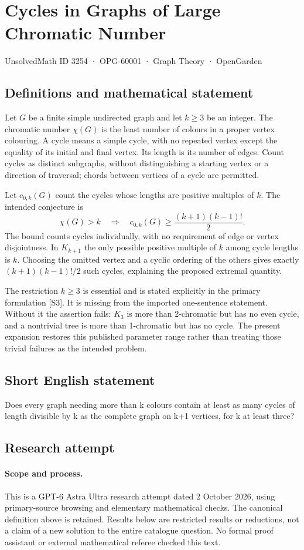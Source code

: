 \documentclass[11pt,a4paper]{article}
\begin{document}
\section*{Cycles in Graphs of Large Chromatic Number}\label{3254}
{\small UnsolvedMath ID 3254 · OPG-60001 · Graph Theory · OpenGarden}
\subsection{Definitions and mathematical statement}
Let $G$ be a finite simple undirected graph and let $k\ge3$ be an integer.
The chromatic number $\chi(G)$ is the least number of colours in a proper
vertex colouring. A cycle means a simple cycle, with no repeated vertex
except the equality of its initial and final vertex. Its length is its
number of edges. Count cycles as distinct subgraphs, without distinguishing
a starting vertex or a direction of traversal; chords between vertices
of a cycle are permitted.

Let $c_{0,k}(G)$ count the cycles whose lengths are positive multiples of
$k$. The intended conjecture is
\[
 \chi(G)>k\quad\Longrightarrow\quad
 c_{0,k}(G)\ge\frac{(k+1)(k-1)!}{2}.
\]
The bound counts cycles individually, with no requirement of edge or
vertex disjointness. In $K_{k+1}$ the only possible positive multiple of
$k$ among cycle lengths is $k$. Choosing the omitted vertex and a cyclic
ordering of the others gives exactly $(k+1)(k-1)!/2$ such cycles, explaining
the proposed extremal quantity.

The restriction $k\ge3$ is essential and is stated explicitly in the
primary formulation [S3]. It is missing from the imported one-sentence
statement. Without it the assertion fails: $K_3$ is more than
2-chromatic but has no even cycle, and a nontrivial tree is more than
1-chromatic but has no cycle. The present expansion restores this
published parameter range rather than treating those trivial failures
as the intended problem.
\subsection{Short English statement}
Does every graph needing more than k colours contain at least as many cycles of length divisible by k as the complete graph on k+1 vertices, for k at least three?
\subsection{Research attempt}
\paragraph{Scope and process.}
This is a GPT-6 Astra Ultra research attempt dated 2 October 2026, using
primary-source browsing and elementary mathematical checks. The canonical
definition above is retained. Results below are restricted results or
reductions, not a claim of a new solution to the entire catalogue question.
No formal proof assistant or external mathematical referee checked this text.
\end{document}
